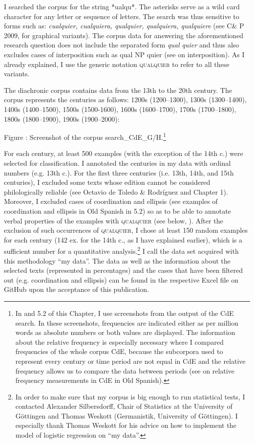   I searched the corpus for the string *ualqu*. The asterisks serve as a wild card character for any letter or sequence of letters. The search was thus sensitive to forms such as: \textit{cualquier, cualquiera, qualquier, qualquiera, qualquiere} (see C\& P 2009, \citealt{Pato2012} for graphical variants). The corpus data for answering the aforementioned research question does not include the separated form \textit{qual quier} and thus also excludes cases of interposition such as qual NP quier (see \citealt{Pato2012} on interposition). As I already explained, I use the generic notation \textsc{qualquier} to refer to all these variants. 

  The diachronic corpus contains data from the 13th to the 20th century. The corpus represents the centuries as follows: 1200s (1200–1300), 1300s (1300–1400), 1400s (1400–1500), 1500s (1500-1600), 1600s (1600–1700), 1700s (1700–1800), 1800s (1800–1900), 1900s (1900–2000):

Figure : Screenshot of the corpus search\_CdE\_G/H.\footnote{{In  and 5.2 of this Chapter, I use screenshots from the output of the CdE search. In these screenshots, frequencies are indicated either as per million words as absolute numbers or both values are displayed. The information about the relative frequency is especially necessary where I compared frequencies of the whole corpus CdE, because the subcorpora used to represent every century or time period are not equal in CdE and the relative frequency allows us to compare the data between periods (see \citealt{Kellert2018} on relative frequency measurements in CdE in Old Spanish).}}

For each century, at least 500 examples (with the exception of the 14th c.) were selected for classification. I annotated the centuries in my data with ordinal numbers (e.g. 13th c.). For the first three centuries (i.e. 13th, 14th, and 15th centuries), I excluded some texts whose edition cannot be considered philologically reliable (see Octavio de Toledo \& Rodríguez \citealt{Molina2017} and Chapter 1). Moreover, I excluded cases of coordination and ellipsis (see examples of coordination and ellipsis in Old Spanish in 5.2) so as to be able to annotate verbal properties of the examples with \textsc{qualquier} (see below, ). After the exclusion of such occurrences of \textsc{qualquier}, I chose at least 150 random examples for each century (142 ex. for the 14th c., as I have explained earlier), which is a sufficient number for a quantitative analysis.\footnote{{In order to make sure that my corpus is big enough to run statistical tests, I contacted} {Alexander Silbersdorff, Chair of Statistics at the University of Göttingen and Thomas Weskott (Germanistik, University of Göttingen). I especially thank Thomas Weskott for his advice on how to implement the model of logistic regression on “my data”.}} I call the data set acquired with this methodology “my data”. The data as well as the information about the selected texts (represented in percentages) and the cases that have been filtered out (e.g. coordination and ellipsis) can be found in the respective Excel file on GitHub upon the acceptance of this publication.

